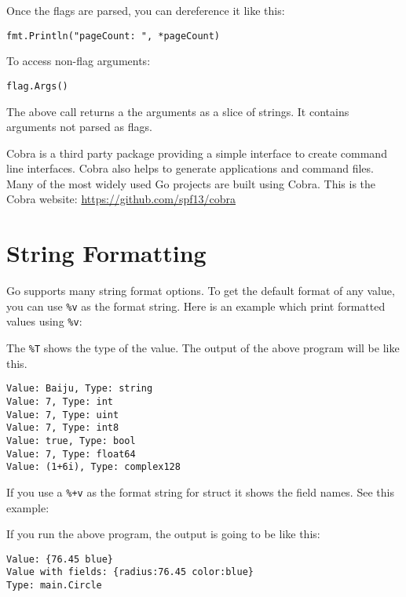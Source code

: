 Once the flags are parsed, you can dereference it like this:

\begin{lstlisting}[numbers=none]
fmt.Println("pageCount: ", *pageCount)
\end{lstlisting}

To access non-flag arguments:

\begin{lstlisting}[numbers=none]
flag.Args()
\end{lstlisting}

The above call returns a the arguments as a slice of strings.  It
contains arguments not parsed as flags.

Cobra is a third party package providing a simple interface to create
command line interfaces.  Cobra also helps to generate applications
and command files.  Many of the most widely used Go projects are built
using Cobra.  This is the Cobra
website: \url{https://github.com/spf13/cobra}

\section{String Formatting}

Go supports many string format options.  To
get the default format of any value, you can use \texttt{\%v} as the
format string.  Here is an example which print formatted values
using \texttt{\%v}:



The \texttt{\%T} shows the type of the value.  The output of the above
program will be like this.

\begin{lstlisting}[numbers=none]
Value: Baiju, Type: string
Value: 7, Type: int
Value: 7, Type: uint
Value: 7, Type: int8
Value: true, Type: bool
Value: 7, Type: float64
Value: (1+6i), Type: complex128
\end{lstlisting}

If you use a \texttt{\%+v} as the format string for struct it shows
the field names.  See this example:



If you run the above program, the output is going to be like this:

\begin{lstlisting}[numbers=none]
Value: {76.45 blue}
Value with fields: {radius:76.45 color:blue}
Type: main.Circle
\end{lstlisting}

